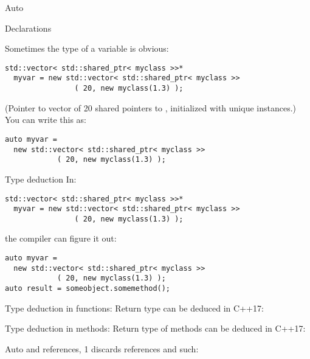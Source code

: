 

 {Auto}

 {Declarations}

Sometimes the type of a variable is obvious:
\begin{lstlisting}
std::vector< std::shared_ptr< myclass >>*
  myvar = new std::vector< std::shared_ptr< myclass >>
                ( 20, new myclass(1.3) );
\end{lstlisting}
(Pointer to vector of 20 shared pointers to , initialized
with unique instances.)  You can write this as:
\begin{lstlisting}
auto myvar =
  new std::vector< std::shared_ptr< myclass >>
            ( 20, new myclass(1.3) );
\end{lstlisting}

\begin{slide}{Type deduction}
  \label{sl:auto-deduct}
In:
\begin{lstlisting}
std::vector< std::shared_ptr< myclass >>*
  myvar = new std::vector< std::shared_ptr< myclass >>
                ( 20, new myclass(1.3) );
\end{lstlisting}
the compiler can figure it out:
\begin{lstlisting}
auto myvar =
  new std::vector< std::shared_ptr< myclass >>
            ( 20, new myclass(1.3) );
auto result = someobject.somemethod();
\end{lstlisting}
\end{slide}

\begin{block}{Type deduction in functions}:
  \label{sl:auto-fun}
  Return type can be deduced in C++17:
\end{block}

\begin{block}{Type deduction in methods}:
  \label{sl:auto-method}
  Return type of methods can be deduced in C++17:
  \lstset{numbers=left,numberstyle=\tiny}
\end{block}

\begin{block}{Auto and references, 1}
  \label{sl:auto-ref1}
   discards references and such:
\end{block}

